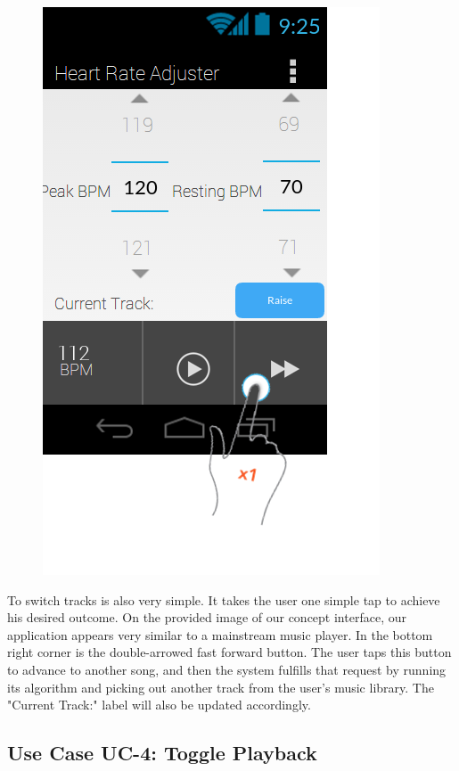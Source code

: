 \documentclass[letterpaper,english, 12pt]{scrreprt}
\begin{document}
\begin{figure}[H]
	\centering
	\includegraphics{img/Prelim_Design/PrelimDesign_2.png}\\
\end{figure}

To switch tracks is also very simple. It takes the user one simple tap to achieve his desired outcome. On the provided image of our concept interface, our application appears very similar to a mainstream music player. In the bottom right corner is the double-arrowed fast forward button. The user taps this button to advance to another song, and then the system fulfills that request by running its algorithm and picking out another track from the user's music library. The "Current Track:" label will also be updated accordingly.

\subsection{Use Case UC-4: Toggle Playback}
\end{document}
